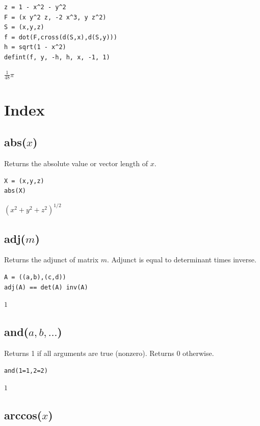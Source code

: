 \documentclass[12pt]{article}
\begin{document}
{\color{blue}
\begin{verbatim}
z = 1 - x^2 - y^2
F = (x y^2 z, -2 x^3, y z^2)
S = (x,y,z)
f = dot(F,cross(d(S,x),d(S,y)))
h = sqrt(1 - x^2)
defint(f, y, -h, h, x, -1, 1)
\end{verbatim}
}

$\displaystyle \tfrac{1}{48}\pi$

\newpage

\section{Index}

\subsection*{abs($x$)}

Returns the absolute value or vector length of $x$.

{\color{blue}
\begin{verbatim}
X = (x,y,z)
abs(X)
\end{verbatim}
}

\noindent
$\left(x^2+y^2+z^2\right)^{1/2}$

\subsection*{adj($m$)}

Returns the adjunct of matrix $m$.
Adjunct is equal to determinant times inverse.

{\color{blue}
\begin{verbatim}
A = ((a,b),(c,d))
adj(A) == det(A) inv(A)
\end{verbatim}
}

\noindent
$1$

\subsection*{and($a,b,\ldots$)}

Returns 1 if all arguments are true (nonzero).
Returns 0 otherwise.

{\color{blue}
\begin{verbatim}
and(1=1,2=2)
\end{verbatim}
}

\noindent
$1$

\subsection*{arccos($x$)}
\end{document}
